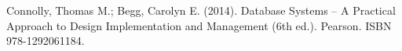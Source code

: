 Connolly, Thomas M.; Begg, Carolyn E. (2014). Database Systems – A Practical Approach to Design Implementation and Management (6th ed.). Pearson. ISBN 978-1292061184.